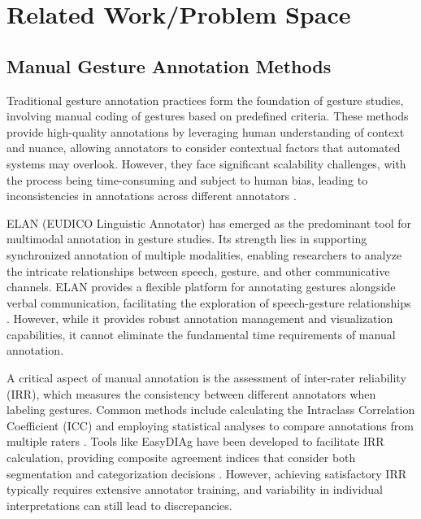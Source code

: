 \section{Related Work/Problem Space}\label{sec:related}

\subsection{Manual Gesture Annotation Methods}\label{subsec:manual}


Traditional gesture annotation practices form the foundation of gesture studies, involving manual coding of gestures based on predefined criteria. These methods provide high-quality annotations by leveraging human understanding of context and nuance, allowing annotators to consider contextual factors that automated systems may overlook. However, they face significant scalability challenges, with the process being time-consuming and subject to human bias, leading to inconsistencies in annotations across different annotators \citep{ripperdaSpeedingDetectionNoniconic2020}.

ELAN (EUDICO Linguistic Annotator) has emerged as the predominant tool for multimodal annotation in gesture studies. Its strength lies in supporting synchronized annotation of multiple modalities, enabling researchers to analyze the intricate relationships between speech, gesture, and other communicative channels. ELAN provides a flexible platform for annotating gestures alongside verbal communication, facilitating the exploration of speech-gesture relationships \citep{kongMultimodalAnalysisTool2014}. However, while it provides robust annotation management and visualization capabilities, it cannot eliminate the fundamental time requirements of manual annotation.

A critical aspect of manual annotation is the assessment of inter-rater reliability (IRR), which measures the consistency between different annotators when labeling gestures. Common methods include calculating the Intraclass Correlation Coefficient (ICC) and employing statistical analyses to compare annotations from multiple raters \citep{liaoReliabilityAssessmentGesture2010}. Tools like EasyDIAg have been developed to facilitate IRR calculation, providing composite agreement indices that consider both segmentation and categorization decisions \citep{holleAutomaticReliabilityAssessment2014}. However, achieving satisfactory IRR typically requires extensive annotator training, and variability in individual interpretations can still lead to discrepancies.

